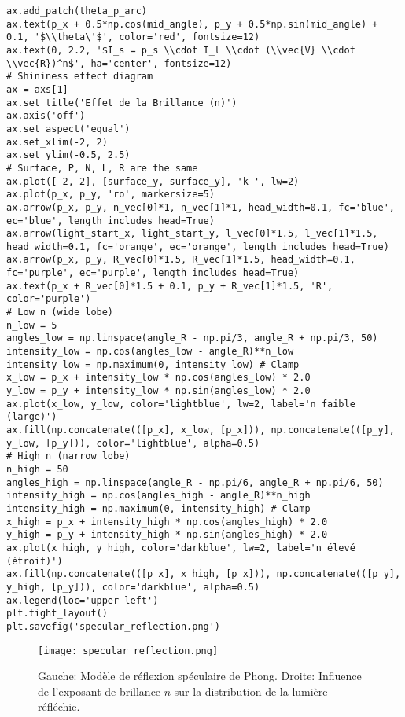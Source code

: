 \begin{verbatim}
ax.add_patch(theta_p_arc)
ax.text(p_x + 0.5*np.cos(mid_angle), p_y + 0.5*np.sin(mid_angle) + 0.1, '$\\theta\'$', color='red', fontsize=12)
ax.text(0, 2.2, '$I_s = p_s \\cdot I_l \\cdot (\\vec{V} \\cdot \\vec{R})^n$', ha='center', fontsize=12)
# Shininess effect diagram
ax = axs[1]
ax.set_title('Effet de la Brillance (n)')
ax.axis('off')
ax.set_aspect('equal')
ax.set_xlim(-2, 2)
ax.set_ylim(-0.5, 2.5)
# Surface, P, N, L, R are the same
ax.plot([-2, 2], [surface_y, surface_y], 'k-', lw=2)
ax.plot(p_x, p_y, 'ro', markersize=5)
ax.arrow(p_x, p_y, n_vec[0]*1, n_vec[1]*1, head_width=0.1, fc='blue', ec='blue', length_includes_head=True)
ax.arrow(light_start_x, light_start_y, l_vec[0]*1.5, l_vec[1]*1.5, head_width=0.1, fc='orange', ec='orange', length_includes_head=True)
ax.arrow(p_x, p_y, R_vec[0]*1.5, R_vec[1]*1.5, head_width=0.1, fc='purple', ec='purple', length_includes_head=True)
ax.text(p_x + R_vec[0]*1.5 + 0.1, p_y + R_vec[1]*1.5, 'R', color='purple')
# Low n (wide lobe)
n_low = 5
angles_low = np.linspace(angle_R - np.pi/3, angle_R + np.pi/3, 50)
intensity_low = np.cos(angles_low - angle_R)**n_low
intensity_low = np.maximum(0, intensity_low) # Clamp
x_low = p_x + intensity_low * np.cos(angles_low) * 2.0
y_low = p_y + intensity_low * np.sin(angles_low) * 2.0
ax.plot(x_low, y_low, color='lightblue', lw=2, label='n faible (large)')
ax.fill(np.concatenate(([p_x], x_low, [p_x])), np.concatenate(([p_y], y_low, [p_y])), color='lightblue', alpha=0.5)
# High n (narrow lobe)
n_high = 50
angles_high = np.linspace(angle_R - np.pi/6, angle_R + np.pi/6, 50)
intensity_high = np.cos(angles_high - angle_R)**n_high
intensity_high = np.maximum(0, intensity_high) # Clamp
x_high = p_x + intensity_high * np.cos(angles_high) * 2.0
y_high = p_y + intensity_high * np.sin(angles_high) * 2.0
ax.plot(x_high, y_high, color='darkblue', lw=2, label='n élevé (étroit)')
ax.fill(np.concatenate(([p_x], x_high, [p_x])), np.concatenate(([p_y], y_high, [p_y])), color='darkblue', alpha=0.5)
ax.legend(loc='upper left')
plt.tight_layout()
plt.savefig('specular_reflection.png')
\end{verbatim}
\begin{figure}[H]
\centering
\texttt{[image: specular\_reflection.png]}
\caption{Gauche: Modèle de réflexion spéculaire de Phong. Droite: Influence de l'exposant de brillance \(n\) sur la distribution de la lumière réfléchie.}
\label{fig:specular_reflection}
\end{figure}
